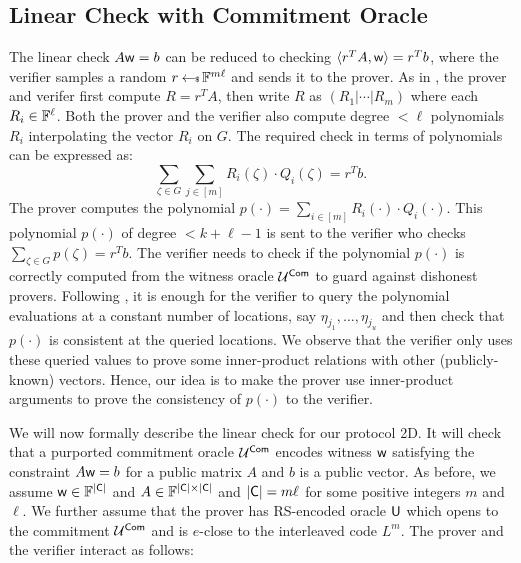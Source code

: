 \subsection{Linear Check with Commitment Oracle}\label{subsec:lincheck2D}
The linear check $A\mathsf{w}=b$ can be reduced to checking $\langle r^TA,\mathsf{w}\rangle=r^Tb$, where the verifier samples a random $r\hskip2.3pt{\gets\!\!\mbox{\tiny${\$}$\normalsize}}\, \mathbb{F}^{m\ell}$ and sends it to the prover. As in \cite{ligero}, the prover and verifer first compute $R=r^TA$, then write $R$ as $(R_{1}|\cdots|R_{m})$ where each $R_i\in \mathbb{F}^\ell$. Both the prover and the verifier also compute degree $<\ell$ polynomials $R_{i}$ interpolating the vector $R_{i}$ on $G$. The required check in terms of polynomials can be expressed as:
\begin{equation}\label{eq:lincheck2D}
\sum_{\zeta\in G}\sum_{j\in [m]}
R_{i}(\zeta) \cdot Q_{i}(\zeta) = r^Tb.
\end{equation}
The prover computes the polynomial $p(\cdot)=\sum_{i\in[m]}R_i(\cdot) \cdot Q_i(\cdot)$. This polynomial $p(\cdot)$ of degree $< k+\ell-1$ is sent to the verifier who checks $\sum_{\zeta\in G}p(\zeta)=r^Tb$. The verifier needs to check if the polynomial $p(\cdot)$ is correctly computed from the witness oracle $\mathcal{U}^{\mathsf{Com}}$ to guard against dishonest provers. Following \cite{ligero}, it is enough for the verifier to query the polynomial evaluations at a constant number of locations, say $\eta_{j_1},\ldots,\eta_{j_u}$ and then check that $p(\cdot)$ is consistent at the queried locations. We observe that the verifier only uses these queried values to prove some inner-product relations with other (publicly-known) vectors. Hence, our idea is to make the prover use inner-product arguments to prove the consistency of $p(\cdot)$ to the verifier.

We will now formally describe the linear check for our protocol \name2D{}. It will check that a purported commitment oracle $\mathcal{U}^{\mathsf{Com}}$ encodes witness $\mathsf{w}$ satisfying the constraint $A\mathsf{w}=b$ for a public matrix $A$ and $b$ is a public vector. As before, we assume $\mathsf{w} \in \mathbb{F}^{\mathsf{|C|}}$ and $A\in \mathbb{F}^{\mathsf{|C|}\times \mathsf{|C|}}$ and
$\mathsf{|C|} = m \ell$ for some positive integers $m$ and $\ell$. We further assume that the prover has RS-encoded oracle $\mathsf{U}$ which opens to the commitment $\mathcal{U}^{\mathsf{Com}}$ and is $e$-close to the interleaved code $L^{m}$. The prover and the verifier interact as follows: 

